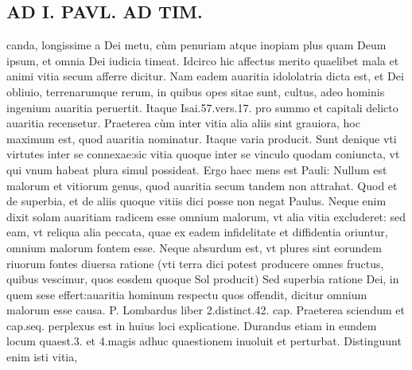 \documentclass{article}
\begin{document}
\begin{pages}
\section*{AD I. PAVL. AD TIM. }
\marginpar{[ p.454 ]}\pstart canda, longissime a Dei metu, cùm penuriam atque inopiam plus quam Deum ipsum, et omnia Dei iudicia timeat. Idcirco hic affectus merito quaelibet mala et animi vitia secum afferre dicitur. Nam eadem auaritia idololatria dicta est, et Dei obliuio, terrenarumque rerum, in quibus opes sitae sunt, cultus, adeo hominis ingenium auaritia peruertit. Itaque Isai.57.vers.17. pro summo et capitali delicto auaritia recensetur. Praeterea cùm inter vitia alia aliis sint grauiora, hoc maximum est, quod auaritia nominatur. Itaque varia producit. Sunt denique vti virtutes inter se connexae:sic vitia quoque inter se vinculo quodam coniuncta, vt qui vnum habeat plura simul possideat. Ergo haec mens est Pauli: Nullum est malorum et vitiorum genus, quod auaritia secum tandem non attrahat. Quod et de superbia, et de aliis quoque  vitiis dici posse non negat Paulus. Neque enim dixit solam auaritiam radicem esse omnium malorum, vt alia vitia excluderet: sed eam, vt reliqua alia peccata, quae ex eadem infidelitate et diffidentia oriuntur, omnium malorum fontem esse. Neque absurdum est, vt plures sint eorundem riuorum fontes diuersa ratione (vti terra dici potest producere omnes fructus, quibus vescimur, quos eosdem quoque  Sol producit) Sed superbia ratione Dei, in quem sese effert:auaritia hominum respectu quos offendit, dicitur omnium malorum esse causa. P. Lombardus liber 2.distinct.42. cap. Praeterea sciendum et cap.seq. perplexus est in huius loci explicatione. Durandus etiam in eundem locum quaest.3. et 4.magis adhuc quaestionem inuoluit et perturbat. Distinguunt enim isti vitia,  \pend

\end{pages}
\end{document}
